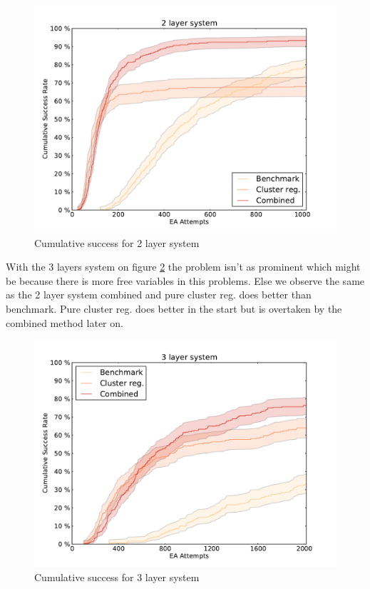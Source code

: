 \documentclass[%
 aps,
 prl,%
 amsmath,amssymb,
 reprint,%
]{revtex4-1}
\begin{document}
\begin{figure}[h]
    \centering
    \includegraphics[width=1.0\columnwidth]{2lsuccess.pdf}
    \caption{Cumulative success for 2 layer system}
    \label{2lfig}
\end{figure}

With the 3 layers system on figure \ref{3lfig} the problem isn't as prominent which might be because there is more free variables in this problems. Else we observe the same as the 2 layer system combined and pure cluster reg. does better than benchmark. Pure cluster reg. does better in the start but is overtaken by the combined method later on. 
 

\begin{figure}[h]
    \centering
    \includegraphics[width=1.0\columnwidth]{3lsuccess.pdf}
    \caption{Cumulative success for 3 layer system}
    \label{3lfig}
\end{figure}
\end{document}
